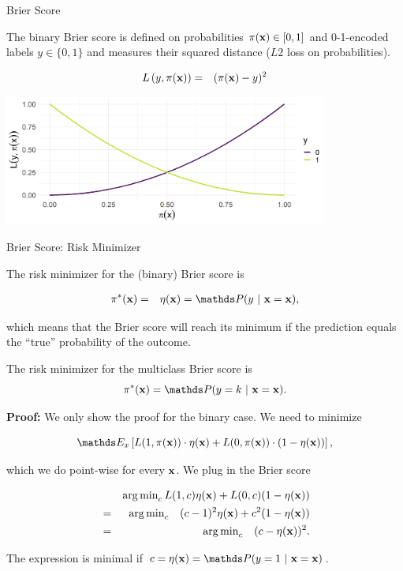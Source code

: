 \documentclass[11pt,compress,t,notes=noshow, xcolor=table]{beamer}
\begin{document}
\begin{vbframe}{Brier Score}

The binary Brier score is defined on probabilities $\pi(\mathbf{x}) \in [0, 1]$ and 0-1-encoded labels $y \in \{0, 1\}$ and measures their squared distance ($L2$ loss on probabilities).

\begin{eqnarray*}
L\left(y, \pi(\mathbf{x})\right) &=& (\pi(\mathbf{x}) - y)^2
\end{eqnarray*}

\vspace{0.2cm}
\begin{center}
\includegraphics[width = 0.8\textwidth]{figure/plot_brier.png}
\end{center}


\end{vbframe}

\begin{vbframe}{Brier Score: Risk Minimizer}

The risk minimizer for the (binary) Brier score is 

\begin{eqnarray*}
\pixbayes &=& \eta(\xv) = \P(y~|~\xv = \xv),
\end{eqnarray*}

which means that the Brier score will reach its minimum if the prediction equals the \enquote{true} probability of the outcome. 

\lz 

The risk minimizer for the multiclass Brier score is 
$$\pi^\ast(\xv) = \P(y = k ~|~ \xv = \xv). $$
 

\textbf{Proof: } We only show the proof for the binary case. We need to minimize 

$$
\E_x \left[L(1, \pix) \cdot \eta(\xv) + L(0, \pix) \cdot (1 - \eta(\xv)) \right],
$$

which we do point-wise for every $\mathbf{x}$. We plug in the Brier score

\vspace*{-0.3cm}

\begin{eqnarray*}
	&& \operatorname{arg\,min}_c L(1, c) \eta(\mathbf{x}) + L(0, c) (1 - \eta(\mathbf{x})) \\ 
	&=&  \operatorname{arg\,min}_c \quad (c - 1)^2 \eta(\mathbf{x}) + c^2 (1 - \eta(\mathbf{x}))\\
	&=&  \operatorname{arg\,min}_c \quad (c - \eta(\mathbf{x}))^2.
\end{eqnarray*}

The expression is minimal if $c = \eta(\xv) = \P(y = 1~|~\xv = \xv)$.

\end{vbframe}
\end{document}
